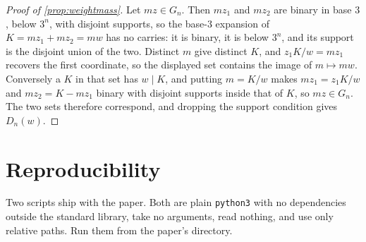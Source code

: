 \documentclass[11pt]{amsart}
\theoremstyle{definition}
\theoremstyle{remark}
\begin{document}
\begin{proof}[Proof of \cref{prop:weightmass}]
Let $mz\in G_n$. Then $mz_1$ and $mz_2$ are binary in base $3$, below $3^n$, with disjoint supports, so the base-$3$ expansion of $K=mz_1+mz_2=mw$ has no carries: it is binary, it is below $3^n$, and its support is the disjoint union of the two. Distinct $m$ give distinct $K$, and $z_1K/w=mz_1$ recovers the first coordinate, so the displayed set contains the image of $m\mapsto mw$. Conversely a $K$ in that set has $w\mid K$, and putting $m=K/w$ makes $mz_1=z_1K/w$ and $mz_2=K-mz_1$ binary with disjoint supports inside that of $K$, so $mz\in G_n$. The two sets therefore correspond, and dropping the support condition gives $D_n(w)$.
\end{proof}

\section{Reproducibility}
\label{sec:repro}

Two scripts ship with the paper. Both are plain \texttt{python3} with no dependencies outside the standard library, take no arguments, read nothing, and use only relative paths. Run them from the paper's directory.
\end{document}
